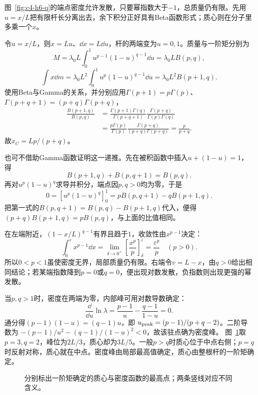\begin{solution}
图~\ref{fig:c4-h6-q}的端点密度允许发散，只要幂指数大于$-1$，总质量仍有限。先用$u=x/L$把有限杆长分离出去，余下积分正好具有Beta函数形式；质心则在分子里多乘一个$x$。


令$u=x/L$，则$x=Lu$、$\dd x=L\dd u$，杆的两端变为$u=0,1$。质量与一阶矩分别为
\[M=\lambda_0L\int_0^1u^{p-1}(1-u)^{q-1}\dd u
=\lambda_0LB(p,q),\]
\[\int x\dd m=\lambda_0L^2\int_0^1u^p(1-u)^{q-1}\dd u
=\lambda_0L^2B(p+1,q).\]
使用Beta与Gamma的关系，并分别应用$\Gamma(p+1)=p\Gamma(p)$、$\Gamma(p+q+1)=(p+q)\Gamma(p+q)$，
\[\begin{aligned}
\frac{B(p+1,q)}{B(p,q)}
&=\frac{\Gamma(p+1)\Gamma(q)}{\Gamma(p+q+1)}
\frac{\Gamma(p+q)}{\Gamma(p)\Gamma(q)}\\
&=\frac{p\Gamma(p)}{\Gamma(p)}
\frac{\Gamma(p+q)}{(p+q)\Gamma(p+q)}=\frac p{p+q}.
\end{aligned}\]
故$\boxed{x_C=L p/(p+q)}$。

也可不借助Gamma函数证明这一递推。先在被积函数中插入$u+(1-u)=1$，得
\[B(p+1,q)+B(p,q+1)=B(p,q).\]
再对$u^p(1-u)^q$求导并积分，端点因$p,q>0$均为零，于是
\[0=[u^p(1-u)^q]_0^1=pB(p,q+1)-qB(p+1,q).\]
把第一式的$B(p,q+1)=B(p,q)-B(p+1,q)$代入，便得
$(p+q)B(p+1,q)=pB(p,q)$，与上面的比值相同。

在左端附近，$(1-x/L)^{q-1}$有界且趋于$1$，收敛性由$x^{p-1}$决定：
\[\int_0^\varepsilon x^{p-1}\dd x
=\lim_{\delta\to0^+}\left[\frac{x^p}{p}\right]_\delta^\varepsilon
=\frac{\varepsilon^p}{p}\quad(p>0).\]
所以$0<p<1$虽使密度无界，局部质量仍有限。右端令$v=L-x$，由$q>0$给出相同结论；若某端指数降到$p=0$或$q=0$，便出现对数发散，负指数则出现更强的幂发散。

当$p,q>1$时，密度在两端为零，内部峰可用对数导数确定：
\[\frac{\dd}{\dd u}\ln\lambda
=\frac{p-1}{u}-\frac{q-1}{1-u}=0.\]
通分得$(p-1)(1-u)=(q-1)u$，即
$u_{\rm peak}=(p-1)/(p+q-2)$。二阶导数为
$-(p-1)/u^2-(q-1)/(1-u)^2<0$，故该驻点确为密度峰。
图~\ref{fig:c4-h6-s}取$p=3,q=2$，峰位为$2L/3$，质心却为$3L/5$。一般$p>q$时质心位于中点右侧；$p=q$时反射对称，质心就在中点。密度峰由局部最高值确定，质心由整根杆的一阶矩确定。

\begin{figure}[H]\centering
{}
\caption{分别标出一阶矩确定的质心与密度函数的最高点；两条竖线对应不同含义。}\label{fig:c4-h6-s}
\end{figure}
\end{solution}

